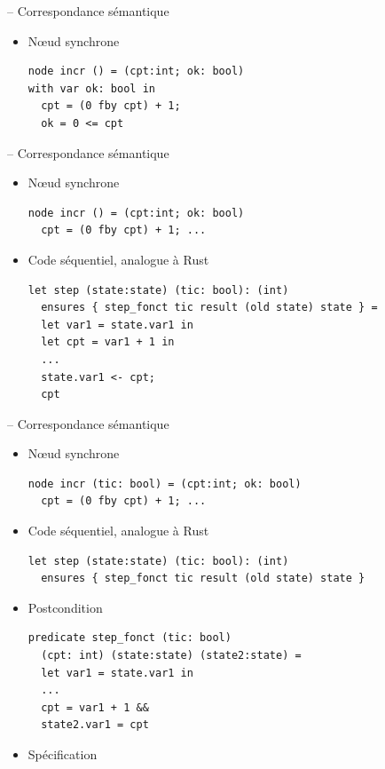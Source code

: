 \documentclass[11pt,usenames,dvipsnames]{beamer}
\begin{document}
\begin{frame}[fragile]{-- Correspondance sémantique}
\begin{itemize}
\item Nœud synchrone
  \begin{lstlisting}[language=minils]
node incr () = (cpt:int; ok: bool)
with var ok: bool in
  cpt = (0 fby cpt) + 1;
  ok = 0 <= cpt\end{lstlisting}
  \end{itemize}
\end{frame}

\begin{frame}[fragile]{-- Correspondance sémantique}
\begin{itemize}
\item Nœud synchrone
  \begin{lstlisting}[language=minils]
node incr () = (cpt:int; ok: bool)
  cpt = (0 fby cpt) + 1; ...\end{lstlisting}
\item Code séquentiel, analogue à Rust 
  \begin{lstlisting}[language=why3]
let step (state:state) (tic: bool): (int) 
  ensures { step_fonct tic result (old state) state } =
  let var1 = state.var1 in
  let cpt = var1 + 1 in
  ...
  state.var1 <- cpt;
  cpt
  \end{lstlisting}
\end{itemize}
\end{frame}

\begin{frame}[fragile]{-- Correspondance sémantique}
\begin{itemize}
\item Nœud synchrone
  \begin{lstlisting}[language=minils]
node incr (tic: bool) = (cpt:int; ok: bool)
  cpt = (0 fby cpt) + 1; ...\end{lstlisting}
\item Code séquentiel, analogue à Rust 
  \begin{lstlisting}[language=why3]
let step (state:state) (tic: bool): (int) 
  ensures { step_fonct tic result (old state) state }\end{lstlisting}
\item Postcondition
  \begin{lstlisting}[language=why3]
predicate step_fonct (tic: bool) 
  (cpt: int) (state:state) (state2:state) =
  let var1 = state.var1 in
  ...
  cpt = var1 + 1 && 
  state2.var1 = cpt\end{lstlisting}
\item Spécification
\end{itemize}
\end{frame}
\end{document}
